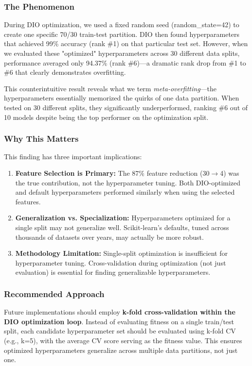 \documentclass[12pt, a4paper]{article}
\begin{document}
\subsubsection{The Phenomenon}
During DIO optimization, we used a fixed random seed (random\_state=42) to create one specific 70/30 train-test partition. DIO then found hyperparameters that achieved 99\% accuracy (rank \#1) on that particular test set. However, when we evaluated these "optimized" hyperparameters across 30 different data splits, performance averaged only 94.37\% (rank \#6)—a dramatic rank drop from \#1 to \#6 that clearly demonstrates overfitting.

This counterintuitive result reveals what we term \textit{meta-overfitting}—the hyperparameters essentially memorized the quirks of one data partition. When tested on 30 different splits, they significantly underperformed, ranking \#6 out of 10 models despite being the top performer on the optimization split.

\subsubsection{Why This Matters}
This finding has three important implications:

\begin{enumerate}
    \item \textbf{Feature Selection is Primary:} The 87\% feature reduction (30$\rightarrow$4) was the true contribution, not the hyperparameter tuning. Both DIO-optimized and default hyperparameters performed similarly when using the selected features.
    
    \item \textbf{Generalization vs. Specialization:} Hyperparameters optimized for a single split may not generalize well. Scikit-learn's defaults, tuned across thousands of datasets over years, may actually be more robust.
    
    \item \textbf{Methodology Limitation:} Single-split optimization is insufficient for hyperparameter tuning. Cross-validation during optimization (not just evaluation) is essential for finding generalizable hyperparameters.
\end{enumerate}

\subsubsection{Recommended Approach}
Future implementations should employ \textbf{k-fold cross-validation within the DIO optimization loop}. Instead of evaluating fitness on a single train/test split, each candidate hyperparameter set should be evaluated using k-fold CV (e.g., k=5), with the average CV score serving as the fitness value. This ensures optimized hyperparameters generalize across multiple data partitions, not just one.
\end{document}
